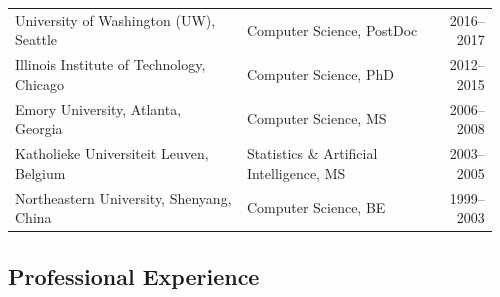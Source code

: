 \documentclass[11pt]{scrartcl}
\newcommand{\arygap}{.9}
\begin{document}
\begin{table}[!h]
{\def\arraystretch{\arygap}\tabcolsep=0pt
\begin{tabular}{p{0.48\linewidth}p{0.42\linewidth}p{0.06\linewidth}}


% 


University of Washington (UW), Seattle
& Computer Science, PostDoc
& \multicolumn{1}{r}{2016--2017}
\\

Illinois Institute of Technology, Chicago
& Computer Science, PhD
& \multicolumn{1}{r}{2012--2015}
\\

Emory University, Atlanta, Georgia
& Computer Science, MS
& \multicolumn{1}{r}{2006--2008}
\\

Katholieke Universiteit Leuven, Belgium
& Statistics \& Artificial Intelligence, MS
& \multicolumn{1}{r}{2003--2005}
\\


Northeastern University, Shenyang, China
& Computer Science, BE
& \multicolumn{1}{r}{1999--2003}

\end{tabular}%
}
\end{table}

\subsection{Professional Experience}\label{appointments}
\end{document}

